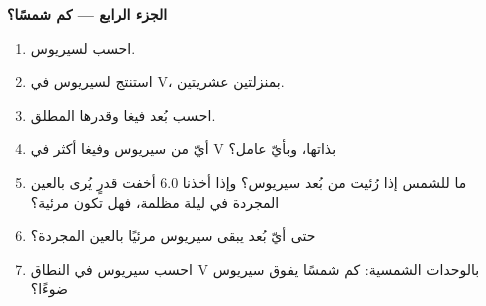\begin{problem}
\medskip
\noindent\textbf{الجزء الرابع --- كم شمسًا؟}
\begin{enumerate}[resume]
  \item احسب  لسيريوس.
  \item استنتج  لسيريوس في V، بمنزلتين عشريتين.
  \item احسب بُعد فيغا وقدرها المطلق.
  \item أيّ من سيريوس وفيغا أكثر  في V بذاتها، وبأيّ عامل؟
  \item ما  للشمس إذا رُئيت من بُعد سيريوس؟ وإذا أخذنا 6.0 أخفت قدرٍ يُرى بالعين المجردة في ليلة مظلمة، فهل تكون مرئية؟
  \item حتى أيّ بُعد يبقى سيريوس مرئيًا بالعين المجردة؟
  \item احسب  سيريوس في النطاق V بالوحدات الشمسية: كم شمسًا يفوق سيريوس ضوءًا؟
\end{enumerate}
\end{problem}
